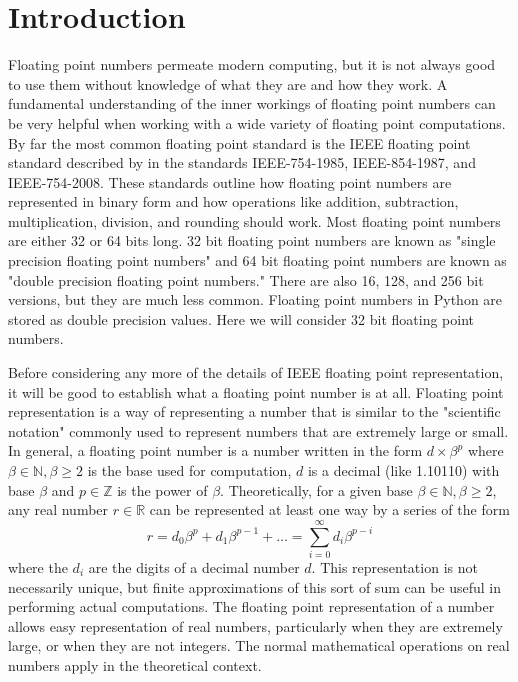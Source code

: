\label{lab:IEEE}

\section*{Introduction}
Floating point numbers permeate modern computing, but it is not always good to use them without knowledge of what they are and how they work.
A fundamental understanding of the inner workings of floating point numbers can be very helpful when working with a wide variety of floating point computations.
By far the most common floating point standard is the IEEE floating point standard described by in the standards IEEE-754-1985, IEEE-854-1987, and IEEE-754-2008.
These standards outline how floating point numbers are represented in binary form and how operations like addition, subtraction, multiplication, division, and rounding should work.
Most floating point numbers are either 32 or 64 bits long.
32 bit floating point numbers are known as "single precision floating point numbers" and 64 bit floating point numbers are known as "double precision floating point numbers."
There are also 16, 128, and 256 bit versions, but they are much less common.
Floating point numbers in Python are stored as double precision values.
Here we will consider 32 bit floating point numbers.

Before considering any more of the details of IEEE floating point representation, it will be good to establish what a floating point number is at all.
Floating point representation is a way of representing a number that is similar to the "scientific notation" commonly used to represent numbers that are extremely large or small.
In general, a floating point number is a number written in the form $d \times \beta^p$ where $\beta \in \mathbb{N}, \beta \geq 2$ is the base used for computation, $d$ is a decimal (like 1.10110) with base $\beta$ and $p\in \mathbb{Z}$ is the power of $\beta$.
Theoretically, for a given base $\beta \in \mathbb{N}, \beta \geq 2$, any real number $r \in \mathbb{R}$ can be represented at least one way by a series of the form
\begin{equation*}
r = d_0 \beta^{p} + d_1 \beta^{p-1} + \dots = \sum_{i=0}^{\infty} d_i \beta^{p-i}
\end{equation*}
where the $d_i$ are the digits of a decimal number $d$.
This representation is not necessarily unique, but finite approximations of this sort of sum can be useful in performing actual computations.
The floating point representation of a number allows easy representation of real numbers, particularly when they are extremely large, or when they are not integers.
The normal mathematical operations on real numbers apply in the theoretical context.

